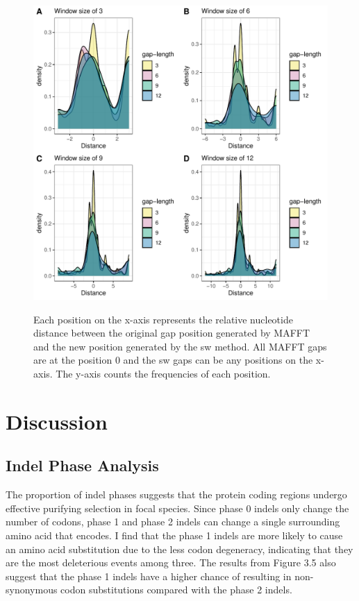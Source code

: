 \begin{figure}[H]
     \centering
     \begin{minipage}[t]{1\textwidth }
     \includegraphics[width=1\linewidth]{Fig7.pdf}
     { {Each position on the x-axis represents the relative nucleotide distance between the original gap position generated by MAFFT and the new position generated by the sw method. All MAFFT gaps are at the position 0 and the sw gaps can be any positions on the x-axis. The y-axis counts the frequencies of each position.}  
 \par}
     \end{minipage}
\end{figure}

\section{Discussion}
\subsection{Indel Phase Analysis}
The proportion of indel phases suggests that the protein coding regions undergo effective purifying selection in focal species. Since phase 0 indels only change the number of codons, phase 1 and phase 2 indels can change a single surrounding amino acid that encodes. I find that the phase 1 indels are more likely to cause an amino acid substitution due to the less codon degeneracy, indicating that they are the most deleterious events among three. The results from Figure 3.5 also suggest that the phase 1 indels have a higher chance of resulting in non-synonymous codon substitutions compared with the phase 2 indels.   

